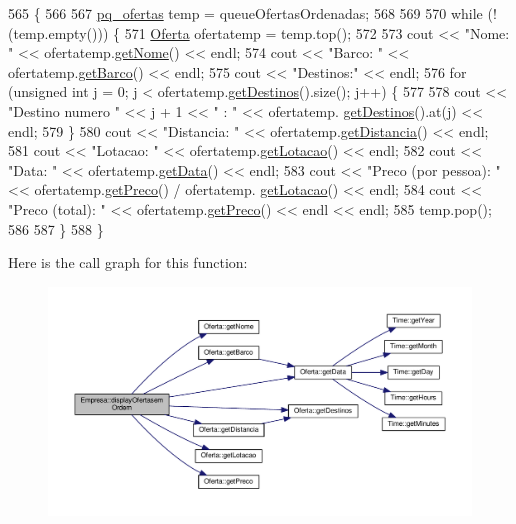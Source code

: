 \begin{DoxyCode}
565                                     \{
566 
567     \hyperlink{cruise_8h_a50ef8d79980af734cd40fd8d4c2ad566}{pq\_ofertas} temp = queueOfertasOrdenadas;
568 
569 
570     \textcolor{keywordflow}{while} (!(temp.empty())) \{
571         \hyperlink{classOferta}{Oferta} ofertatemp = temp.top();
572 
573         cout << \textcolor{stringliteral}{"Nome: "} << ofertatemp.\hyperlink{classOferta_a16da38d9f369b000cb544c34200707b8}{getNome}() << endl;
574         cout << \textcolor{stringliteral}{"Barco: "} << ofertatemp.\hyperlink{classOferta_aaed9b5937f9f33d2980fcc13ac02132c}{getBarco}() << endl;
575         cout << \textcolor{stringliteral}{"Destinos:"} << endl;
576         \textcolor{keywordflow}{for} (\textcolor{keywordtype}{unsigned} \textcolor{keywordtype}{int} j = 0; j < ofertatemp.\hyperlink{classOferta_a746c91e5db19098d211a3f6bde2ec8ec}{getDestinos}().size(); j++) \{
577 
578             cout << \textcolor{stringliteral}{"Destino numero "} << j + 1 << \textcolor{stringliteral}{" : "} << ofertatemp.
      \hyperlink{classOferta_a746c91e5db19098d211a3f6bde2ec8ec}{getDestinos}().at(j) << endl;
579         \}
580         cout << \textcolor{stringliteral}{"Distancia: "} << ofertatemp.\hyperlink{classOferta_a0d07f80f25f4fb21c0819c3e25d67fb9}{getDistancia}() << endl;
581         cout << \textcolor{stringliteral}{"Lotacao: "} << ofertatemp.\hyperlink{classOferta_a9c8fbec401e54e590828209931bf25b0}{getLotacao}() << endl;
582         cout << \textcolor{stringliteral}{"Data: "} << ofertatemp.\hyperlink{classOferta_a2b156b75371ad59af54ad96ad79c9d1e}{getData}() << endl;
583         cout << \textcolor{stringliteral}{"Preco (por pessoa): "} << ofertatemp.\hyperlink{classOferta_a6237afc2e8a33fb55b1ef0decf9d9aaa}{getPreco}() / ofertatemp.
      \hyperlink{classOferta_a9c8fbec401e54e590828209931bf25b0}{getLotacao}() << endl;
584         cout << \textcolor{stringliteral}{"Preco (total): "} << ofertatemp.\hyperlink{classOferta_a6237afc2e8a33fb55b1ef0decf9d9aaa}{getPreco}() << endl << endl;
585         temp.pop();
586 
587     \}
588 \}
\end{DoxyCode}


Here is the call graph for this function\+:
\nopagebreak
\begin{figure}[H]
\begin{center}
\leavevmode
\includegraphics[width=350pt]{classEmpresa_acd458614a3cca3f432b54212a2e72584_cgraph}
\end{center}
\end{figure}


